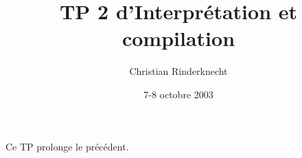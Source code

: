 \documentclass[a4paper,11pt]{article}
\title{TP 2 d'Interprétation et compilation}
\author{Christian Rinderknecht}
\date{7-8 octobre 2003}
\begin{document}
\maketitle

Ce TP prolonge le précédent.

\bigskip


\end{document}
